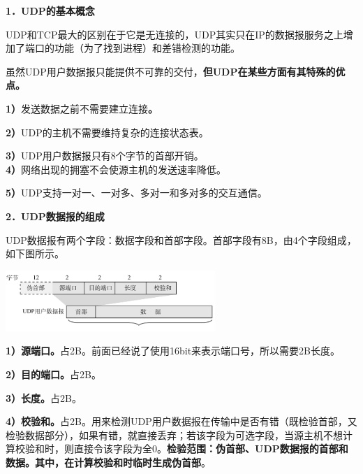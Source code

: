 \textbf{{1．UDP的基本概念}}

UDP和TCP最大的区别在于它是无连接的，UDP其实只在IP的数据报服务之上增加了端口的功能（为了找到进程）和差错检测的功能。

虽然UDP用户数据报只能提供不可靠的交付，\textbf{但UDP在某些方面有其特殊的优点。}

\textbf{1）}发送数据之前不需要建立连接\textbf{。}

\textbf{2）}UDP的主机不需要维持复杂的连接状态表。

\textbf{3）}UDP用户数据报只有8个字节的首部开销。\\

\textbf{4）}网络出现的拥塞不会使源主机的发送速率降低。

\textbf{5）}UDP支持一对一、一对多、多对一和多对多的交互通信。

\textbf{{2．UDP数据报的组成}}

UDP数据报有两个字段：数据字段和首部字段。首部字段有8B，由4个字段组成，如下图所示。

\includegraphics[width=3.12500in,height=0.90625in]{png-jpeg-pics/8BF4290E57D76DF799073EA77AC636FA.png}

\textbf{1）源端口。}占2B。前面已经说了使用16bit来表示端口号，所以需要2B长度。

\textbf{2）目的端口。}占2B。

\textbf{3）长度。}占2B。

\textbf{4）校验和。}占2B。用来检测UDP用户数据报在传输中是否有错（既检验首部，又检验数据部分），如果有错，就直接丢弃；若该字段为可选字段，当源主机不想计算校验和时，则直接令该字段为全0。\textbf{检验范围：伪首部、UDP数据报的首部和数据。其中，在计算校验和时临时生成伪首部}。
